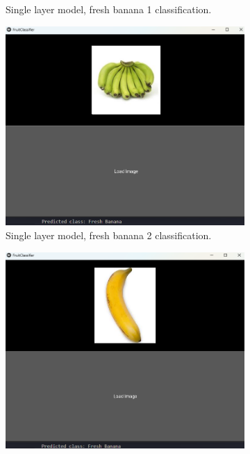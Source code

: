\documentclass[conference]{IEEEtran}
\begin{document}
\begin{figure}[h]
\begin{subfigure}[b]{0.48\linewidth}
        \caption{Single layer model, fresh banana 1 classification.}
        \label{figFA}
    \end{subfigure}
    \hfill
    \begin{subfigure}[b]{0.48\linewidth}
        \centering
        \includegraphics[width=\linewidth]{1layer banana2.png}
        \caption{Single layer model, fresh banana 2 classification.}
        \label{figFB}
    \end{subfigure}
    \hfill
    \begin{subfigure}[b]{0.48\linewidth}
        \centering
        \includegraphics[width=\linewidth]{1layer banana3.png}

\end{subfigure}
\end{figure}
\end{document}
